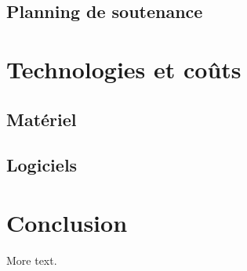 \documentclass[11pt]{article} %
\begin{document}
\subsection{Planning de soutenance}

\section{Technologies et coûts}

\subsection{Matériel}

\subsection{Logiciels}

\section{Conclusion}

More text.
\end{document}

